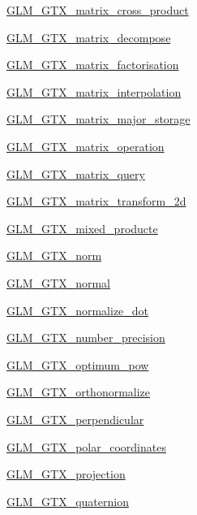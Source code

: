 \begin{DoxyCompactItemize}
\item 
\hyperlink{group__gtx__matrix__cross__product}{G\+L\+M\+\_\+\+G\+T\+X\+\_\+matrix\+\_\+cross\+\_\+product}
\item 
\hyperlink{group__gtx__matrix__decompose}{G\+L\+M\+\_\+\+G\+T\+X\+\_\+matrix\+\_\+decompose}
\item 
\hyperlink{group__gtx__matrix__factorisation}{G\+L\+M\+\_\+\+G\+T\+X\+\_\+matrix\+\_\+factorisation}
\item 
\hyperlink{group__gtx__matrix__interpolation}{G\+L\+M\+\_\+\+G\+T\+X\+\_\+matrix\+\_\+interpolation}
\item 
\hyperlink{group__gtx__matrix__major__storage}{G\+L\+M\+\_\+\+G\+T\+X\+\_\+matrix\+\_\+major\+\_\+storage}
\item 
\hyperlink{group__gtx__matrix__operation}{G\+L\+M\+\_\+\+G\+T\+X\+\_\+matrix\+\_\+operation}
\item 
\hyperlink{group__gtx__matrix__query}{G\+L\+M\+\_\+\+G\+T\+X\+\_\+matrix\+\_\+query}
\item 
\hyperlink{group__gtx__matrix__transform__2d}{G\+L\+M\+\_\+\+G\+T\+X\+\_\+matrix\+\_\+transform\+\_\+2d}
\item 
\hyperlink{group__gtx__mixed__product}{G\+L\+M\+\_\+\+G\+T\+X\+\_\+mixed\+\_\+producte}
\item 
\hyperlink{group__gtx__norm}{G\+L\+M\+\_\+\+G\+T\+X\+\_\+norm}
\item 
\hyperlink{group__gtx__normal}{G\+L\+M\+\_\+\+G\+T\+X\+\_\+normal}
\item 
\hyperlink{group__gtx__normalize__dot}{G\+L\+M\+\_\+\+G\+T\+X\+\_\+normalize\+\_\+dot}
\item 
\hyperlink{group__gtx__number__precision}{G\+L\+M\+\_\+\+G\+T\+X\+\_\+number\+\_\+precision}
\item 
\hyperlink{group__gtx__optimum__pow}{G\+L\+M\+\_\+\+G\+T\+X\+\_\+optimum\+\_\+pow}
\item 
\hyperlink{group__gtx__orthonormalize}{G\+L\+M\+\_\+\+G\+T\+X\+\_\+orthonormalize}
\item 
\hyperlink{group__gtx__perpendicular}{G\+L\+M\+\_\+\+G\+T\+X\+\_\+perpendicular}
\item 
\hyperlink{group__gtx__polar__coordinates}{G\+L\+M\+\_\+\+G\+T\+X\+\_\+polar\+\_\+coordinates}
\item 
\hyperlink{group__gtx__projection}{G\+L\+M\+\_\+\+G\+T\+X\+\_\+projection}
\item 
\hyperlink{group__gtx__quaternion}{G\+L\+M\+\_\+\+G\+T\+X\+\_\+quaternion}
\item 

\end{DoxyCompactItemize}

